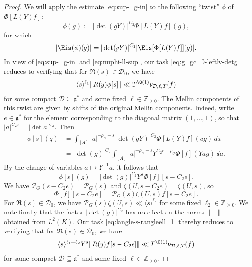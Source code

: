 \begin{proof}
  We will apply the estimate \ref{eq:sup-_g-in} to the following ``twist'' $\phi$ of $\Phi[L(Y) f]$:
  \begin{equation*}
    \phi(g) :=
    |\det(g Y)|^{C_2} \Phi[L(Y)f](g),
  \end{equation*}
  for which
  \begin{equation*}
    |\Eis(\phi)(g)| = |\det(g Y)|^{C_2} |\Eis[\Phi[L(Y) f]](g)|.
  \end{equation*}
  In view of \eqref{eq:sup-_g-in} and \eqref{eq:nuphi-ll-sup}, our task \eqref{eq:g_gc_0-leftlv-detg} reduces to verifying that for $\Re(s) \in \mathcal{D}_0$, we have
  \begin{equation}\label{eq:langle-s-rangleell_1}
    \langle s \rangle^{\ell_1} \|R(y) \phi[s]\| \ll T^{\O(1)} \nu_{\mathcal{D}, \ell, T}(f)
  \end{equation}
  for some compact $\mathcal{D} \subseteq \mathfrak{a}^*$ and some fixed $\ell \in \mathbb{Z}_{\geq 0}$.  The Mellin components of this twist are given by shifts of the original Mellin components.  Indeed, write $e \in \mathfrak{a}^*$ for the element corresponding to the diagonal matrix $(1,\dotsc,1)$, so that $|a|^{C_2 e} = |\det a|^{C_2}$.  Then
  \begin{align*}
    \phi[s](g)
    &=
      \int_{[A]} |a|^{-\rho_U - s} |\det(g Y)|^{C_2} \Phi[L(Y) f](a g) \, d a \\
    &=
      |\det(g)|^{C_2} \int_{[A]} |a|^{-\rho_U - s} Y^{C_2 e - \rho_U} \Phi[f](Y a g) \, d a.
  \end{align*}
  By the change of variables $a \mapsto Y^{-1} a$, it follows that
  \begin{equation}\label{eq:phis-=-left}
    \phi[s](g) = |\det(g)|^{C_2} Y^s \Phi[f][s - C_2 e].
  \end{equation}
  We have $\mathcal{P}_G(s - C_2 e) = \mathcal{P}_G(s)$ and $\zeta(U,s - C_2 e) = \zeta(U,s)$, so
  \begin{equation*}
    \Phi[f][s - C_2 e]
    = \mathcal{P}_G(s) \zeta(U,s) f[s - C_2 e].
  \end{equation*}
  For $\Re(s) \in \mathcal{D}_0$, we have $\mathcal{P}_G(s) \zeta(U,s) \ll \langle s \rangle^{\ell_2}$ for some fixed $\ell_2 \in \mathbb{Z}_{\geq 0}$.  We note finally that the factor $|\det(g)|^{C_2}$ has no effect on the norms $\|.\|$ obtained from $L^2(K)$.  Our task \eqref{eq:langle-s-rangleell_1} thereby reduces to verifying that for $\Re(s) \in \mathcal{D}_0$, we have
  \begin{equation}\label{eq:langle-s-rangleell_1-1}
    \langle s \rangle^{\ell_1 + \ell_2} Y^s \|R(y) f[s-C_2 e]\| \ll T^{\O(1)} \nu_{\mathcal{D},\ell,T}(f)
  \end{equation}
  for some compact $\mathcal{D} \subseteq \mathfrak{a}^*$ and some fixed $\ell \in \mathbb{Z}_{\geq 0}$.


\end{proof}
